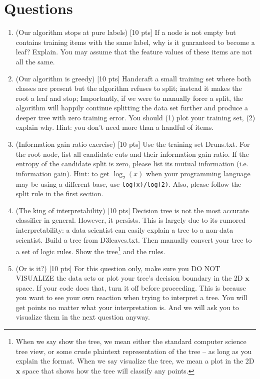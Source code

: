 \documentclass[letter]{article}
\theoremstyle{definition}
\def\x{\mathbf x}
\begin{document}
\section{Questions}
\begin{enumerate}
\item (Our algorithm stops at pure labels) [10 pts] If a node is not empty but contains training items with the same label, why is it guaranteed to become a leaf?  Explain. You may assume that the feature values of these items are not all the same. \\

\item (Our algorithm is greedy)  [10 pts] Handcraft a small training set where both classes are present but the algorithm refuses to split; instead it makes the root a leaf and stop;
Importantly, if we were to manually force a split, the algorithm will happily continue splitting the data set further and produce a deeper tree with zero training error.
You should (1) plot your training set, (2) explain why.  Hint: you don't need more than a handful of items. \\

\item (Information gain ratio exercise)  [10 pts] Use the training set Druns.txt.  For the root node, list all candidate cuts and their information gain ratio. If the entropy of the candidate split is zero, please list its mutual information (i.e. information gain). Hint: to get $\log_2(x)$ when your programming language may be using a different base, use \verb|log(x)/log(2)|. Also, please follow the split rule in the first section. \\

\item (The king of interpretability)  [10 pts] Decision tree is not the most accurate classifier in general.  However, it persists.  This is largely due to its rumored interpretability: a data scientist can easily explain a tree to a non-data scientist.  Build a tree from D3leaves.txt.  Then manually convert your tree to a set of logic rules.  Show the tree\footnote{When we say show the tree, we mean either the standard computer science tree view, or some crude plaintext representation of the tree -- as long as you explain the format.  When we say visualize the tree, we mean a plot in the 2D $\x$ space that shows how the tree will classify any points.} and the rules. \\

\item (Or is it?)  [10 pts] For this question only, make sure you DO NOT VISUALIZE the data sets or plot your tree's decision boundary in the 2D $\x$ space.  If your code does that, turn it off before proceeding.  This is because you want to see your own reaction when trying to interpret a tree.  You will get points no matter what your interpretation is.
And we will ask you to visualize them in the next question anyway.
  \begin{itemize}
  

\end{itemize}
\end{enumerate}
\end{document}
